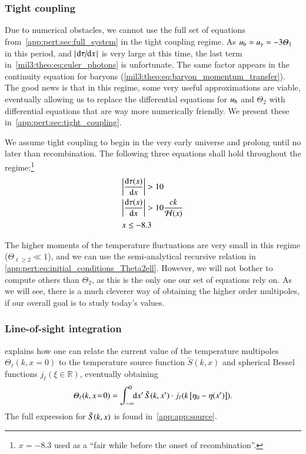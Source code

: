 \subsubsection{Tight coupling}
    Due to numerical obstacles, we cannot use the full set of equations from~\cref{app:pert:sec:full_system} in the tight coupling regime. As $u_\mathrm{b}\simeq u_\gamma = -3\varTheta_1$ in this period, and $\abs{\dv*{\tau}{x}}$ is very large at this time, the last term in~\cref{mil3:theo:eq:euler_photons} is unfortunate. The same factor appears in the continuity equation for baryons (\cref{mil3:theo:eq:baryon_momentum_transfer}). The good news is that in this regime, some very useful approximations are viable, eventually allowing us to replace the differential equations for $u_\mathrm{b}$ and $\Theta_2$ with differential equations that are way more numerically friendly. We present these in~\cref{app:pert:sec:tight_coupling}.

    We assume tight coupling to begin in the very early universe and prolong until no later than recombination. The following three equations shall hold throughout the regime:\footnote{$x=-8.3$ used as a ``fair while before the onset of recombination''.}
    \begin{subequations}\label{mil3:theo:eq:tc_conditions}
    \begin{align}
        &\abs{\dv{\tau(x)}{x}} > 10 \label{mil3:theo:eq:tc_condition_one} \\
        & \abs{\dv{\tau(x)}{x}} > 10 \frac{ck}{\mathcal{H}(x)} \label{mil3:theo:eq:tc_condition_two}\\
        &x \leq -8.3 \label{mil3:theo:eq:tc_condition_three}
    \end{align}
    \end{subequations}

    The higher moments of the temperature fluctuations are very small in this regime ($\Theta_{\ell\geq 2}\ll 1$), and we can use the semi-analytical recursive relation in \cref{app:pert:eq:initial_conditions_Theta2ell}. However, we will not bother to compute others than $\Theta_2$, as this is the only one our set of equations rely on. As we will see, there is a much cleverer way of obtaining the higher order multipoles, if our overall goal is to study today's values.



\subsubsection{Line-of-sight integration}
    \citet{Callin2006} explains how one can relate the current value of the temperature multipoles $\Theta_\ell(k, x\!=\!0)$ to the temperature source function $\tilde{S}(k, x)$ and spherical Bessel functions $j_\ell(\xi\!\in\!\mathbb{R})$, eventually obtaining
    \begin{equation}\label{mil3:theo:eq:temp_multipole_and_source_func}
        \varTheta_\ell (k, x\!=\!0) = \int_{-\infty}^{0}\!\!\mathop{}\!\mathrm{d} {x'}\, \tilde{S}(k,x') \cdot j_\ell(k \left[\eta_0 - \eta(x')\right]).
    \end{equation}
    The full expression for $\tilde{S}(k, x)$ is found in~\cref{app:app:source}.

